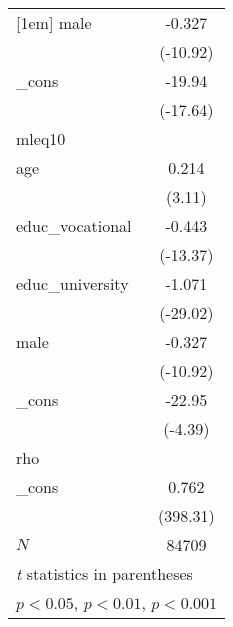 {\begin{tabular}{l*{1}{c}}
[1em]
male        &      -0.327\sym{***}\\
            &    (-10.92)         \\
[1em]
\_cons      &      -19.94\sym{***}\\
            &    (-17.64)         \\
\hline
mleq10      &                     \\
age         &       0.214\sym{**} \\
            &      (3.11)         \\
[1em]
educ\_vocational&      -0.443\sym{***}\\
            &    (-13.37)         \\
[1em]
educ\_university&      -1.071\sym{***}\\
            &    (-29.02)         \\
[1em]
male        &      -0.327\sym{***}\\
            &    (-10.92)         \\
[1em]
\_cons      &      -22.95\sym{***}\\
            &     (-4.39)         \\
\hline
rho         &                     \\
\_cons      &       0.762\sym{***}\\
            &    (398.31)         \\
\hline
\(N\)       &       84709         \\
\hline\hline
\multicolumn{2}{l}{\footnotesize \textit{t} statistics in parentheses}\\
\multicolumn{2}{l}{\footnotesize \sym{*} \(p<0.05\), \sym{**} \(p<0.01\), \sym{***} \(p<0.001\)}\\
\end{tabular}
}
